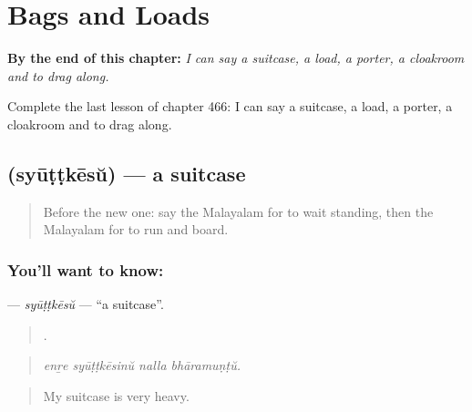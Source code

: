 
\chapter{Bags and Loads}
\label{ch:ml-bags-and-loads}

\begin{chapteropening}
\textbf{By the end of this chapter:} \emph{I can say a suitcase, a load, a porter, a cloakroom and to drag along.}

Complete the last lesson of chapter 466: I can say a suitcase, a load, a porter, a cloakroom and to drag along.
\end{chapteropening}

\section[\texorpdfstring{\ml{സ്യൂട്ട്കേസ്} (syūṭṭkēsŭ)}{സ്യൂട്ട്കേസ് (syūṭṭkēsŭ)}]{ (syūṭṭkēsŭ) — a suitcase}

\label{lesson:ML-C466-syuttkesu}



\begin{quote}
Before the new one: say the Malayalam for to wait standing, then the Malayalam for to run and board.
\end{quote}

\subsection*{You'll want to know: }
\textbf{} — \emph{syūṭṭkēsŭ} — \textquotedblleft{}a suitcase\textquotedblright{}.

\begin{quote}
   .
\end{quote}

\begin{quote}
\emph{enṟe syūṭṭkēsinŭ nalla bhāramuṇṭŭ.}
\end{quote}

\begin{quote}
My suitcase is very heavy.
\end{quote}

